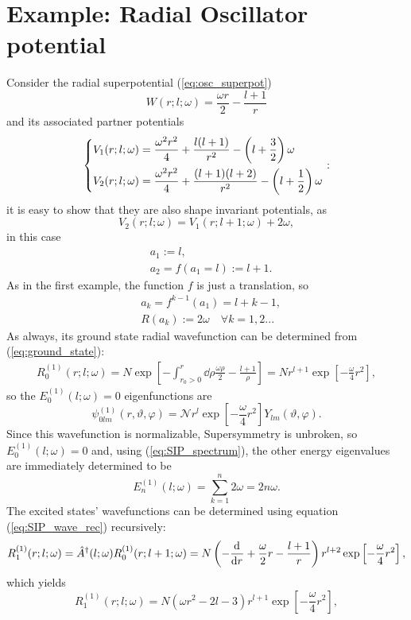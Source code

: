 \section{Example: Radial Oscillator potential}
Consider the radial superpotential (\ref{eq:osc_superpot})
$$W(r;l;\omega)=\frac{\omega r}{2}-\frac{l+1}{r}$$
and its associated partner potentials
\begin{equation*}
\begin{dcases}
V_1(r;l;\omega)=\frac{\omega^2r^2}{4}+\frac{l(l+1)}{r^2}-\left(l+\frac{3}{2}\right)\omega\\
V_2(r;l;\omega)=\frac{\omega^2r^2}{4}+\frac{(l+1)(l+2)}{r^2}-\left(l+\frac{1}{2}\right)\omega
\end{dcases}:
\end{equation*}
it is easy to show that they are also shape invariant potentials, as
$$V_2(r;l;\omega) = V_1(r;l+1;\omega)+2\omega,$$
in this case
\begin{align*}
&a_1:=l,\\
&a_2=f(a_1=l):=l+1.
\end{align*}
As in the first example, the function $f$ is just a translation, so
\begin{align*}
&a_k=f^{k-1}(a_1)=l+k-1,\\
&R(a_k):=2\omega\quad\forall k=1,2...
\end{align*}
As always, its ground state radial wavefunction can be determined from (\ref{eq:ground_state}):
\begin{gather*}
    R_{0}^{(1)}(r;l;\omega)=N\exp\left[-\int_{r_0>0}^{r}\dd\rho\frac{\omega\rho}{2}-
    \frac{l+1}{\rho}\right]= N r^{l+1}\exp\left[-\frac{\omega}{4}r^2\right],
\end{gather*}
so the $E^{(1)}_0(l;\omega)=0$ eigenfunctions are
$$\psi^{(1)}_{0lm}(r,\vartheta,\varphi)=\mathcal{N}r^{l}\exp\left[-\frac{\omega}{4}r^2\right]
Y_{lm}(\vartheta,\varphi).$$
Since this wavefunction is normalizable, Supersymmetry is unbroken, so $E_0^{(1)}(l;\omega)=0$
and, using (\ref{eq:SIP_spectrum}), the other energy eigenvalues are immediately determined to be
$$E_n^{(1)}(l;\omega)=\sum_{k=1}^{n}2\omega=2n\omega.$$
The excited states' wavefunctions can be determined using equation (\ref{eq:SIP_wave_rec})
recursively:
\begin{gather*}
R^{(1)}_{1}(r;l;\omega)=\hat A^\dagger(l;\omega)R^{(1)}_{0}(r;l+1;\omega)=N\left(
-\dv[]{}{r}+\frac{\omega}{2}r-\frac{l+1}{r}\right)r^{l+2}\exp\left[-\frac{\omega}{4}r^2\right],
\end{gather*}
which yields
$$R_1^{(1)}(r;l;\omega)=N\left(\omega r^2-2l-3\right)r^{l+1}\exp\left[-\frac{\omega}{4}r^2
\right],$$
